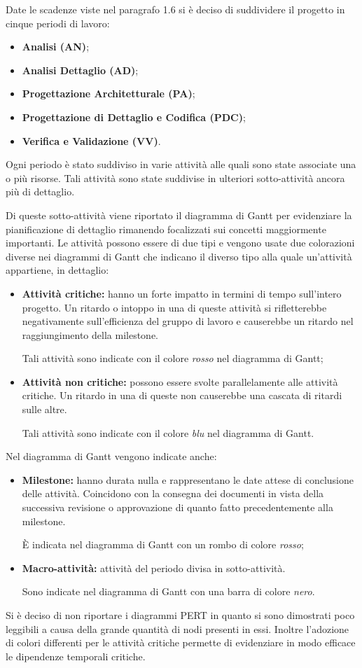 Date le scadenze viste nel paragrafo 1.6 si è deciso di suddividere il progetto \PROGETTO{} in cinque periodi di lavoro:
\begin{itemize}
	\item \textbf{Analisi (AN)};
	\item \textbf{Analisi Dettaglio (AD)};
	\item \textbf{Progettazione Architetturale (PA)};
	\item \textbf{Progettazione di Dettaglio e Codifica (PDC)};
	\item \textbf{Verifica e Validazione (VV)}.
\end{itemize}
Ogni periodo è stato suddiviso in varie attività alle quali sono state associate una o più risorse. Tali attività sono state suddivise in ulteriori sotto-attività ancora più di dettaglio. 

\noindent Di queste sotto-attività viene riportato il diagramma di \gls{Gantt} per evidenziare la pianificazione di dettaglio rimanendo focalizzati sui concetti maggiormente importanti. Le attività possono essere di due tipi e vengono usate due colorazioni diverse nei diagrammi di \gls{Gantt} che indicano il diverso tipo alla quale un'attività appartiene, in dettaglio:
\begin{itemize}
	\item \textbf{Attività critiche:} hanno un forte impatto in termini di tempo sull'intero progetto. Un ritardo o intoppo in una di queste attività si rifletterebbe negativamente sull'efficienza del gruppo di lavoro e causerebbe un ritardo nel raggiungimento della \gls{milestone}.
	
	\noindent Tali attività sono indicate con il colore \textit{rosso} nel diagramma di \gls{Gantt};
	\item \textbf{Attività non critiche:} possono essere svolte parallelamente alle attività critiche. Un ritardo in una di	queste non causerebbe una cascata di ritardi sulle altre.
	
	\noindent Tali attività sono indicate con il colore \textit{blu} nel diagramma di \gls{Gantt}.
\end{itemize}
Nel diagramma di \gls{Gantt} vengono indicate anche:
\begin{itemize}
	\item \textbf{\gls{Milestone}:} hanno durata nulla e rappresentano le date attese di conclusione delle attività. Coincidono con la consegna dei documenti in vista della successiva revisione o approvazione di quanto fatto precedentemente alla \gls{milestone}. 
	
	\noindent È indicata nel diagramma di \gls{Gantt} con un rombo di colore \textit{rosso};
	\item \textbf{Macro-attività:} attività del periodo divisa in sotto-attività. 
	
	\noindent Sono indicate nel diagramma di \gls{Gantt} con una barra di colore \textit{nero}.
\end{itemize}
Si è deciso di non riportare i diagrammi \gls{PERT} in quanto si sono dimostrati poco leggibili a causa della grande quantità di nodi presenti in essi. Inoltre l'adozione di colori differenti per le attività critiche permette di evidenziare in modo efficace le dipendenze temporali critiche.


